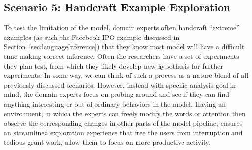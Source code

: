 \subsection{Scenario 5: Handcraft Example Exploration}
To test the limitation of the model, domain experts often handcraft ``extreme'' examples (as such the Facebook IPO example discussed in Section~\ref{sec:languageInference}) that they know most model will have a difficult time making correct inference.
%
Often the researchers have a set of experiments they plan test, from which they likely develop new hypothesis for further experiments.
%
In some way, we can think of such a process as a nature blend of all previously discussed scenarios. However,  instead with specific analysis goal in mind, the domain experts focus on probing around and see if they can find anything interesting or out-of-ordinary behaviors in the model.
%
Having an environment, in which the experts can freely modify the words or attention then observe the corresponding changes in other parts of the model pipeline, ensures an streamlined exploration experience that free the users from interruption and tedious grunt work, allow them to focus on more productive activity.

